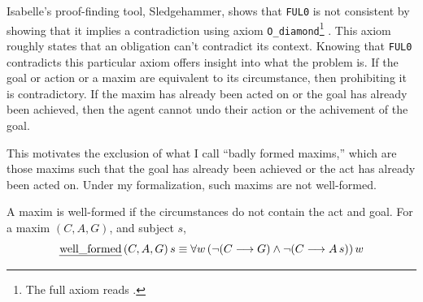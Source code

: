 \begin{isabellebody}
%
\begin{isamarkuptext}%
Isabelle's proof-finding tool, Sledgehammer, shows that 
\texttt{FUL0} is not consistent by showing that it implies a contradiction 
using axiom \texttt{O\_diamond}\footnote{The full axiom reads .} \citep{sledgehammer}. 
This axiom roughly states that an obligation can't contradict its context. Knowing that \texttt{FUL0}
contradicts this particular axiom offers insight into what the problem is. If the goal or action
or a maxim are equivalent to its circumstance, then prohibiting it is contradictory. If the maxim has already been 
acted on or the goal has already been achieved, then the agent cannot undo their action or the achivement 
of the goal. 

This motivates the exclusion of what I call ``badly formed maxims,'' which are those maxims such that 
the goal has already been achieved or the act has already been acted on. Under my formalization, such maxims are
not well-formed. 

\begin{definition}
A maxim is well-formed if the circumstances do not contain the act and goal. For a maxim $(C, A, G)$, and subject $s$, 
$$ \text{\emph{well\_formed}} \, (C, A, G) \, s \equiv \forall w \, (\neg (C \longrightarrow G) \wedge \neg (C \longrightarrow A \, s)) \, w$$

\end{definition}


\end{isamarkuptext}
\end{isabellebody}
